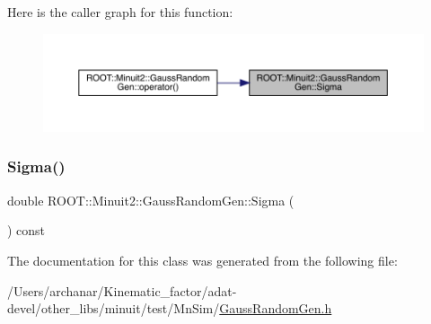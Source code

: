 Here is the caller graph for this function\+:
\nopagebreak
\begin{figure}[H]
\begin{center}
\leavevmode
\includegraphics[width=350pt]{d8/dd8/classROOT_1_1Minuit2_1_1GaussRandomGen_a13d1989f3eced64b30a04788f8ed2cad_icgraph}
\end{center}
\end{figure}
\mbox{\label{classROOT_1_1Minuit2_1_1GaussRandomGen_a13d1989f3eced64b30a04788f8ed2cad}} 
\subsubsection{\texorpdfstring{Sigma()}{Sigma()}\hspace{0.1cm}{\footnotesize\ttfamily [2/2]}}
{\footnotesize\ttfamily double R\+O\+O\+T\+::\+Minuit2\+::\+Gauss\+Random\+Gen\+::\+Sigma (\begin{DoxyParamCaption}{ }\end{DoxyParamCaption}) const\hspace{0.3cm}{\ttfamily [inline]}}



The documentation for this class was generated from the following file\+:\begin{DoxyCompactItemize}
\item 
/\+Users/archanar/\+Kinematic\+\_\+factor/adat-\/devel/other\+\_\+libs/minuit/test/\+Mn\+Sim/\mbox{\hyperlink{adat-devel_2other__libs_2minuit_2test_2MnSim_2GaussRandomGen_8h}{Gauss\+Random\+Gen.\+h}}\end{DoxyCompactItemize}
